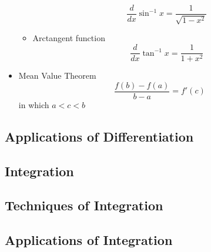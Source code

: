 \begin{itemize}
\begin{itemize}
					\begin{equation}
						\dfrac{d}{dx} \sin^{-1} x = \frac{1}{\sqrt{1-x^2}}
					\end{equation}
				\item Arctangent function
					\begin{equation}
						\dfrac{d}{dx} \tan^{-1} x = \frac{1}{1+x^2}
					\end{equation}
			\end{itemize}
		\item Mean Value Theorem
			\begin{equation}
				\frac{f(b) - f(a)}{b-a} = f'(c)
			\end{equation}
			in which $a < c < b$
	\end{itemize}
\subsection{Applications of Differentiation}
\subsection{Integration}
\subsection{Techniques of Integration}
\subsection{Applications of Integration}
